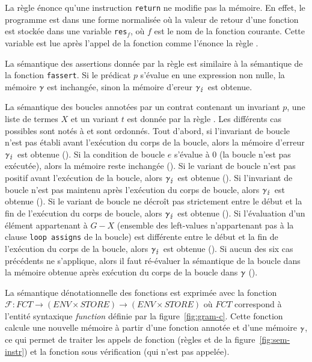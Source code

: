 La règle  énonce qu'une instruction \lstinline'return' ne
modifie pas la mémoire.
En effet, le programme est dans une forme normalisée où la valeur de retour
d'une fonction est stockée dans une variable \lstinline'res'$_f$, où
$f$ est le nom de la fonction courante.
Cette variable est lue après l'appel de la fonction comme l'énonce la règle
.

La sémantique des assertions \eacsl donnée par la règle  est
similaire à la sémantique de la fonction \lstinline'fassert'.
Si le prédicat $p$ s'évalue en une expression non nulle,
la mémoire $\gamma$ est inchangée, sinon la mémoire d'ereur $\gamma_\lightning$ est
obtenue.

La sémantique des boucles annotées par un contrat contenant un invariant
$p$, une liste de termes $X$ et un variant $t$ est
donnée par la règle .
Les différents cas possibles sont notés  à
 et sont ordonnés.
Tout d'abord, si l'invariant de boucle n'est pas établi avant l'exécution du
corps de la boucle, alors la mémoire d'erreur $\gamma_\lightning$ est obtenue
().
Si la condition de boucle $e$ s'évalue à $0$ (la boucle n'est pas exécutée),
alors la mémoire reste inchangée ().
Si le variant de boucle n'est pas positif avant l'exécution de la boucle, alors
$\gamma_\lightning$ est obtenue ().
Si l'invariant de boucle n'est pas maintenu après l'exécution du corps de
boucle, alors $\gamma_\lightning$ est obtenue ().
Si le variant de boucle ne décroît pas strictement entre le début et la fin de
l'exécution du corps de boucle, alors $\gamma_\lightning$ est obtenue
().
Si l'évaluation d'un élément appartenant à $G-X$ (ensemble des left-values
n'appartenant pas à la clause \lstinline'loop assigns' de la boucle) est
différente entre le début et la fin de l'exécution du corps de la boucle, alors
$\gamma_\lightning$ est obtenue ().
Si aucun des six cas précédents ne s'applique, alors il faut ré-évaluer la
sémantique de la boucle dans la mémoire obtenue après exécution du corps de la
boucle dans $\gamma$ ().





La sémantique dénotationnelle des fonctions est exprimée avec la fonction
$\mathcal{F} : FCT \rightarrow (ENV \times STORE) \rightarrow (ENV \times STORE)$ où $FCT$ correspond à
l'entité syntaxique \textit{function} définie par la figure~\ref{fig:gram-c}.
Cette fonction calcule une nouvelle mémoire à partir d'une fonction annotée et
d'une mémoire $\gamma$, ce qui permet de traiter les appels de fonction (règles
 et  de la figure~\ref{fig:sem-instr}) et la
fonction sous vérification (qui n'est pas appelée).

